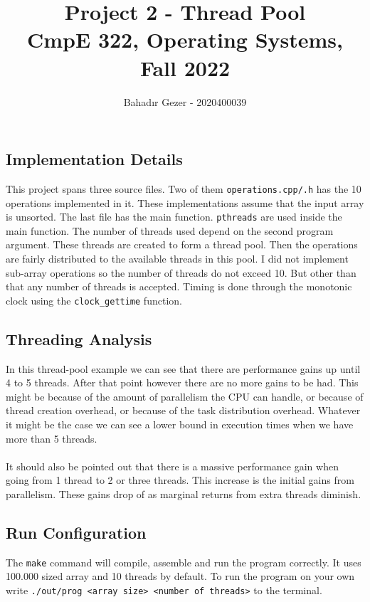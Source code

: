 \documentclass[10pt]{article}
\title{\vspace{-1cm} \Huge Project 2 - Thread Pool\\ \LARGE CmpE 322, Operating Systems, Fall 2022 }
\author{
    Bahadır Gezer - 2020400039
}
\begin{document}
\maketitle

\subsection*{Implementation Details}
\indent \indent This project spans three source files. Two of them \verb|operations.cpp/.h| has the 10 operations implemented in it. These implementations assume that the input array is unsorted. The last file has the main function. \texttt{pthreads} are used inside the main function. The number of threads used depend on the second program argument. These threads are created to form a thread pool. Then the operations are fairly distributed to the available threads in this pool. I did not implement sub-array operations so the number of threads do not exceed 10. But other than that any number of threads is accepted. Timing is done through the monotonic clock using the \texttt{clock\_gettime} function.

\subsection*{Threading Analysis}
\indent \indent In this thread-pool example we can see that there are performance gains up until 4 to 5 threads. After that point however there are no more gains to be had. This might be because of the amount of parallelism the CPU can handle, or because of thread creation overhead, or because of the task distribution overhead. Whatever it might be the case we can see a lower bound in execution times when we have more than 5 threads.
\\ \\
\indent It should also be pointed out that there is a massive performance gain when going from 1 thread to 2 or three threads. This increase is the initial gains from parallelism. These gains drop of as marginal returns from extra threads diminish.

\subsection*{Run Configuration}
The \texttt{make} command will compile, assemble and run the program correctly. It uses 100.000 sized array and 10 threads by default. To run the program on your own write \texttt{./out/prog <array size> <number of threads>} to the terminal.
\end{document}
